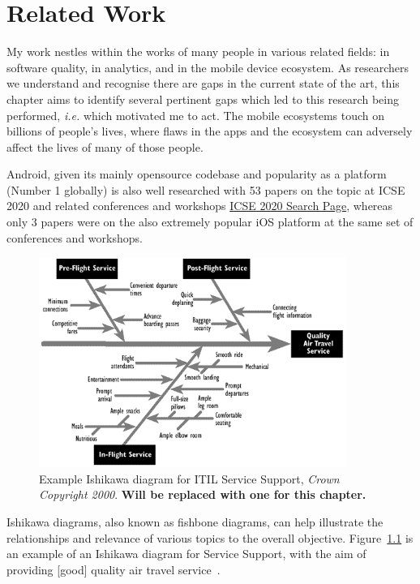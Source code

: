 \chapter{Related Work}
My work nestles within the works of many people in various related fields: in software quality, in analytics, and in the mobile device ecosystem. As researchers we understand and recognise there are gaps in the current state of the art, this chapter aims to identify several pertinent gaps which led to this research being performed, \emph{i.e.} which motivated me to act. The mobile ecosystems touch on billions of people's lives, where flaws in the apps and the ecosystem can adversely affect the lives of many of those people. 

Android, given its mainly opensource codebase and popularity as a platform (Number 1 globally) is also well researched with 53 papers on the topic at ICSE 2020 and related conferences and workshops \href{https://conferences.computer.org/icse/#!/search}{ICSE 2020 Search Page}, whereas only 3 papers were on the also extremely popular iOS platform at the same set of conferences and workshops.

\begin{figure}[ht]
    \centering
    \includegraphics[width=10cm]{images/ishikawa_fishbone_diagram_example_itil.png}
    \caption{Example Ishikawa diagram for ITIL Service Support, \emph{Crown Copyright 2000}. \textbf{Will be replaced with one for this chapter.}}
    \label{fig:ishikawa_example_itil}
\end{figure}

Ishikawa diagrams, also known as fishbone diagrams, can help illustrate the relationships and relevance of various topics to the overall objective. Figure~\ref{fig:ishikawa_example_itil} is an example of an Ishikawa diagram for Service Support, with the aim of providing [good] quality air travel service~\cite{itil_ishikawa_example}. 

